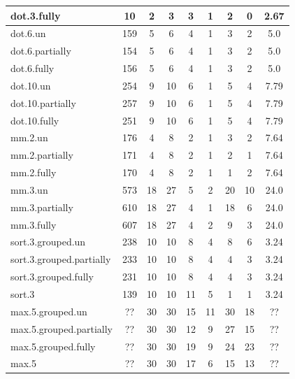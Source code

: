 \begin{table}
\begin{tabular}{lcccccccc}
    dot.3.fully & 10 & 2 & 3 & 3 & 1 & 2 & 0 & 2.67\\
    \midrule
    dot.6.un & 159 & 5 & 6 & 4 & 1 & 3 & 2 & 5.0\\
    dot.6.partially & 154 & 5 & 6 & 4 & 1 & 3 & 2 & 5.0\\
    dot.6.fully & 156 & 5 & 6 & 4 & 1 & 3 & 2 & 5.0\\
    \midrule
    dot.10.un & 254 & 9 & 10 & 6 & 1 & 5 & 4 & 7.79\\
    dot.10.partially & 257 & 9 & 10 & 6 & 1 & 5 & 4 & 7.79\\
    dot.10.fully & 251 & 9 & 10 & 6 & 1 & 5 & 4 & 7.79\\
    \midrule
    mm.2.un & 176 & 4 & 8 & 2 & 1 & 3 & 2 & 7.64\\
    mm.2.partially & 171 & 4 & 8 & 2 & 1 & 2 & 1 & 7.64\\
    mm.2.fully & 170 & 4 & 8 & 2 & 1 & 1 & 2 & 7.64\\
    \midrule
    mm.3.un & 573 & 18 & 27 & 5 & 2 & 20 & 10 & 24.0\\
    mm.3.partially & 610 & 18 & 27 & 4 & 1 & 18 & 6 & 24.0\\
    mm.3.fully & 607 & 18 & 27 & 4 & 2 & 9 & 3 & 24.0\\
    \midrule
    sort.3.grouped.un & 238 & 10 & 10 & 8 & 4 & 8 & 6 & 3.24\\
    sort.3.grouped.partially & 233 & 10 & 10 & 8 & 4 & 4 & 3 & 3.24\\
    sort.3.grouped.fully & 231 & 10 & 10 & 8 & 4 & 4 & 3 & 3.24\\
    sort.3 & 139 & 10 & 10 & 11 & 5 & 1 & 1 & 3.24\\
    \midrule
    max.5.grouped.un & ?? & 30 & 30 & 15 & 11 & 30 & 18 & ??\\
    max.5.grouped.partially & ?? & 30 & 30 & 12 & 9 & 27 & 15 & ??\\
    max.5.grouped.fully & ?? & 30 & 30 & 19 & 9 & 24 & 23 & ??\\
    max.5 & ?? & 30 & 30 & 17 & 6 & 15 & 13 & ??\\
    \bottomrule
    \end{tabular}
\end{table}


